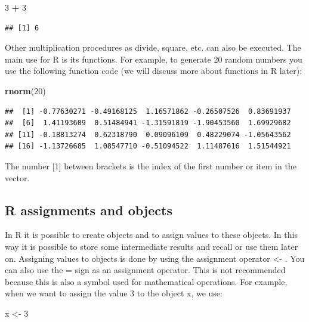 \documentclass[]{book}
\newenvironment{Shaded}{\begin{snugshade}}{\end{snugshade}}
\newcommand{\KeywordTok}[1]{\textcolor[rgb]{0.13,0.29,0.53}{\textbf{#1}}}
\newcommand{\DecValTok}[1]{\textcolor[rgb]{0.00,0.00,0.81}{#1}}
\newcommand{\StringTok}[1]{\textcolor[rgb]{0.31,0.60,0.02}{#1}}
\newcommand{\OperatorTok}[1]{\textcolor[rgb]{0.81,0.36,0.00}{\textbf{#1}}}
\newcommand{\NormalTok}[1]{#1}
\begin{document}
\begin{Shaded}
\begin{Highlighting}[]
\DecValTok{3} \OperatorTok{+}\StringTok{ }\DecValTok{3}
\end{Highlighting}
\end{Shaded}

\begin{verbatim}
## [1] 6
\end{verbatim}

Other multiplication procedures as divide, square, etc. can also be
executed. The main use for R is its functions. For example, to generate
20 random numbers you use the following function code (we will discuss
more about functions in R later):

\begin{Shaded}
\begin{Highlighting}[]
\KeywordTok{rnorm}\NormalTok{(}\DecValTok{20}\NormalTok{)}
\end{Highlighting}
\end{Shaded}

\begin{verbatim}
##  [1] -0.77630271 -0.49168125  1.16571862 -0.26507526  0.83691937
##  [6]  1.41193609  0.51484941 -1.31591819 -1.90453560  1.69929682
## [11] -0.18813274  0.62318790  0.09096109  0.48229074 -1.05643562
## [16] -1.13726685  1.08547710 -0.51094522  1.11487616  1.51544921
\end{verbatim}

The number {[}1{]} between brackets is the index of the first number or
item in the vector.

\subsection{R assignments and objects}\label{r-assignments-and-objects}

In R it is possible to create objects and to assign values to these
objects. In this way it is possible to store some intermediate results
and recall or use them later on. Assigning values to objects is done by
using the assignment operator \textless{}- . You can also use the = sign
as an assignment operator. This is not recommended because this is also
a symbol used for mathematical operations. For example, when we want to
assign the value 3 to the object x, we use:

\begin{Shaded}
\begin{Highlighting}[]
\NormalTok{x <-}\StringTok{ }\DecValTok{3} 
\end{Highlighting}
\end{Shaded}
\end{document}
